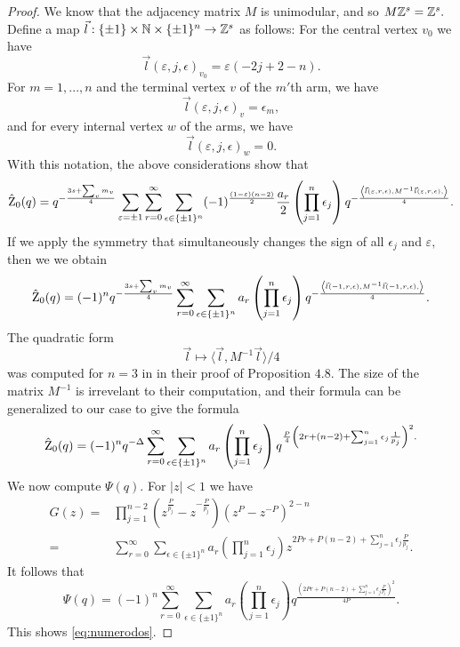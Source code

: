 \begin{proof}
  	
  	We know that the adjacency matrix $M$ is unimodular, and so $M\mathbb{Z}^s=\mathbb{Z}^s.$ Define a map $\vec{l}:\{\pm 1 \}\times  \mathbb{N} \times \{\pm 1\}^{n} \rightarrow \mathbb{Z}^s$  as follows: For the central vertex $v_0$ we have
  	\begin{equation}\vec{l}(\varepsilon,j,\epsilon)_{v_0}=\varepsilon(-2j+2-n).
  	\end{equation}
  	For $m=1,...,n$ and the terminal vertex $v$ of the $m'$th arm, we have
  	$$\vec{l}(\varepsilon, j,\epsilon)_{v}=\epsilon_m,$$
  	and for every internal vertex $w$ of the arms, we have
  	$$\vec{l}(\varepsilon,j,\epsilon)_{w}=0.$$
  	With this notation, the above considerations show that
  	\begin{equation}
  	\hat{\operatorname{Z}}_0(q)=q^{-\frac{3s+\sum_v m_v}{4}} \sum_{\varepsilon=\pm 1} \sum_{r=0}^{\infty} \sum_{\epsilon \in  \{\pm 1\}^{n}} (-1)^{\frac{(1-\varepsilon)(n-2)}{2}} \frac{a_r}{2} \left(\prod_{j=1}^n \epsilon_j \right)
  	q^{-\frac{\left\langle \vec{l}(\varepsilon ,r,\epsilon),M^{-1} \vec{l}(\varepsilon,r,\epsilon), \right\rangle}{4}}.
  	\end{equation}
  	If we apply the symmetry that simultaneously changes the sign of all $\epsilon_j$ and $\varepsilon,$ then we we obtain
  	\begin{equation}
  	\hat{\operatorname{Z}}_0(q)=(-1)^{n}q^{-\frac{3s+\sum_v m_v}{4}} \sum_{r=0}^{\infty} \sum_{\epsilon \in  \{\pm 1\}^{n}} a_r  \left(\prod_{j=1}^n \epsilon_j \right) q^{-\frac{\left\langle \vec{l}(-1,r,\epsilon),M^{-1} \vec{l}(-1,r,\epsilon), \right\rangle}{4}}.
  	\end{equation}
  	The quadratic form $$
  	\vec{l} \mapsto \langle \vec{l} ,M^{-1}\vec{l}\rangle/4$$ was computed for $n=3$ in \cite{GukovCiprian19} in their proof of Proposition $4.8$. The size of the matrix $M^{-1}$ is irrevelant to their computation, and their formula can be generalized to our case to give the formula \begin{equation}
  	\hat{\operatorname{Z}}_0(q)=(-1)^nq^{-\Delta} \sum_{r=0}^{\infty} \sum_{\epsilon \in  \{\pm 1\}^{n}} a_r \left( \prod_{j=1}^n \epsilon_j \right) q^{\frac{P}{4}\left(2r+(n-2)+\sum_{j=1}^n  \epsilon_j \frac{1}{p_j}\right)^2.}
  	\end{equation}
  	We now compute $\Psi(q).$  For $\lvert z \rvert <1$ we have
  	\begin{align}
  	G(z)= &\prod_{j=1}^{n-2} \left(z^{\frac{P}{p_j}}-z^{-\frac{P}{p_j}}\right)\left(z^{P}-z^{-P}\right)^{2-n}
  	\\ =& \sum_{r=0}^{\infty} \sum_{\epsilon \in  \{\pm 1\}^{n}} a_r \left( \prod_{j=1}^n \epsilon_j   \right) z^{2Pr+P(n-2)+\sum_{j=1}^{n}\epsilon_j  \frac{P}{p_j}}.
  	\end{align}
  	It follows that 
  	\begin{equation}
  	\Psi(q)=(-1)^n \sum_{r=0}^{\infty} \sum_{\epsilon \in  \{\pm 1\}^{n}} a_r  \left( \prod_{j=1}^n \epsilon_j  \right) q^{\frac{\left(2Pr+P(n-2)+\sum_{j=1}^{n}\epsilon_j  \frac{P}{p_j}\right)^2}{4P}}.
  	\end{equation}
  	This shows  \eqref{eq:numerodos}. \end{proof}
  
